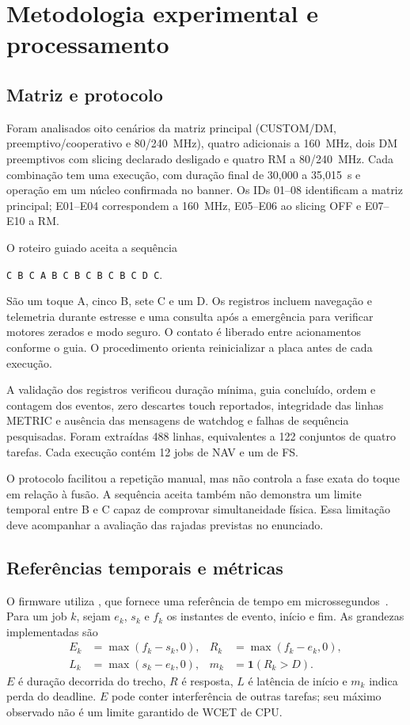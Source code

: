 \section{Metodologia experimental e processamento}
\label{sec:metodologia}

\subsection{Matriz e protocolo}

Foram analisados oito cenários da matriz principal (CUSTOM/DM, preemptivo/cooperativo e 80/240~MHz), quatro adicionais a 160~MHz, dois DM preemptivos com slicing declarado desligado e quatro RM a 80/240~MHz. Cada combinação tem uma execução, com duração final de 30,000 a 35,015~s e operação em um núcleo confirmada no banner. Os IDs 01--08 identificam a matriz principal; E01--E04 correspondem a 160~MHz, E05--E06 ao slicing OFF e E07--E10 a RM.

O roteiro guiado aceita a sequência
\begin{center}\small
\texttt{C B C A B C B C B C B C D C}.
\end{center}
São um toque A, cinco B, sete C e um D. Os registros incluem navegação e telemetria durante estresse e uma consulta após a emergência para verificar motores zerados e modo seguro. O contato é liberado entre acionamentos conforme o guia. O procedimento orienta reinicializar a placa antes de cada execução.

A validação dos registros verificou duração mínima, guia concluído, ordem e contagem dos eventos, zero descartes touch reportados, integridade das linhas METRIC e ausência das mensagens de watchdog e falhas de sequência pesquisadas. Foram extraídas 488 linhas, equivalentes a 122 conjuntos de quatro tarefas. Cada execução contém 12 jobs de NAV e um de FS.

O protocolo facilitou a repetição manual, mas não controla a fase exata do toque em relação à fusão. A sequência aceita também não demonstra um limite temporal entre B e C capaz de comprovar simultaneidade física. Essa limitação deve acompanhar a avaliação das rajadas previstas no enunciado.

\subsection{Referências temporais e métricas}

O firmware utiliza , que fornece uma referência de tempo em microssegundos~\cite{idf_timer}. Para um job $k$, sejam $e_k$, $s_k$ e $f_k$ os instantes de evento, início e fim. As grandezas implementadas são
\begin{align}
E_k &= \max(f_k-s_k,0), & R_k &= \max(f_k-e_k,0),\\
L_k &= \max(s_k-e_k,0), & m_k &= \mathbf{1}(R_k>D).
\end{align}
$E$ é duração decorrida do trecho, $R$ é resposta, $L$ é latência de início e $m_k$ indica perda do deadline. $E$ pode conter interferência de outras tarefas; seu máximo observado não é um limite garantido de WCET de CPU.

